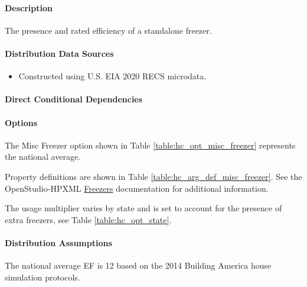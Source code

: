 \paragraph{Description}
% 
The presence and rated efficiency of a standalone freezer.

\paragraph{Distribution Data Sources}
% 
\begin{itemize}
\item 

Constructed using U.S. EIA 2020 RECS microdata.
\end{itemize}

\paragraph{Direct Conditional Dependencies}


\paragraph{Options}
The Misc Freezer option shown in Table \ref{table:hc_opt_misc_freezer} represents the national average.



Property definitions are shown in Table \ref{table:hc_arg_def_misc_freezer}. See the OpenStudio-HPXML \href{https://openstudio-hpxml.readthedocs.io/en/v1.10.0/workflow_inputs.html#hpxml-freezers}{Freezers} documentation for additional information.



The usage multiplier varies by state and is set to account for the presence of extra freezers, see Table \ref{table:hc_opt_state}.

\paragraph{Distribution Assumptions}
% 
The national average EF is 12 based on the 2014 Building America house simulation protocols.

